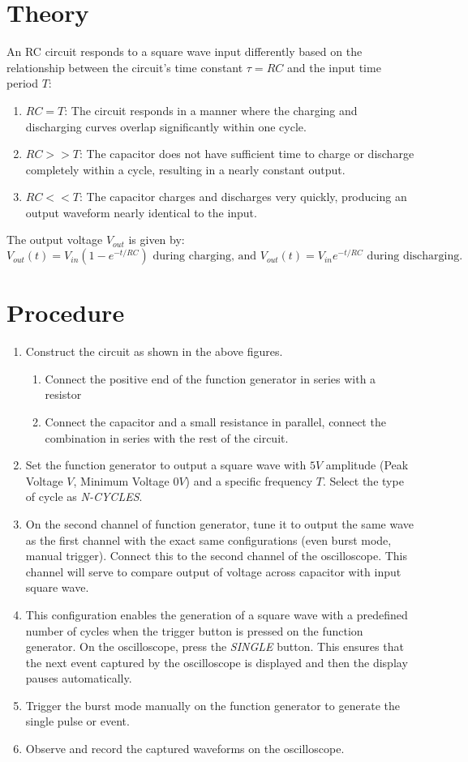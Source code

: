 \documentclass[12pt,a4paper]{article}
\begin{document}
\section*{Theory}
An RC circuit responds to a square wave input differently based on the relationship between the circuit's time constant \(\tau = RC\) and the input time period \(T\):
\begin{enumerate}
    \item \(RC = T\): The circuit responds in a manner where the charging and discharging curves overlap significantly within one cycle.
    \item \(RC >> T\): The capacitor does not have sufficient time to charge or discharge completely within a cycle, resulting in a nearly constant output.
    \item \(RC << T\): The capacitor charges and discharges very quickly, producing an output waveform nearly identical to the input.
\end{enumerate}

The output voltage \(V_{out}\) is given by:
\[ V_{out}(t) = V_{in}(1 - e^{-t/RC}) \text{ during charging, and } V_{out}(t) = V_{in}e^{-t/RC} \text{ during discharging.} \]

\section*{Procedure}
\begin{enumerate}
    \item Construct the circuit as shown in the above figures.
    \begin{enumerate}
        \item Connect the positive end of the function generator in series with a resistor
        \item Connect the capacitor and a small resistance in parallel, connect the combination in series with the rest of the circuit.
    \end{enumerate}
    \item Set the function generator to output a square wave with $5V$ amplitude (Peak Voltage $V$, Minimum Voltage $0V$) and a specific frequency $T$.
    Select the type of cycle as \textit{N-CYCLES}.
    \item On the second channel of function generator, tune it to output the same wave as the first channel with the exact same configurations (even burst mode, manual trigger). Connect this to the second channel of the oscilloscope. This channel will serve to compare output of voltage across capacitor with input square wave.
    \item This configuration enables the generation of a square wave with a predefined number of cycles when the trigger button is pressed on the function generator.
    On the oscilloscope, press the \textit{SINGLE} button. This ensures that the next event captured by the oscilloscope is displayed and then the display pauses automatically.
    \item Trigger the burst mode manually on the function generator to generate the single pulse or event.
    \item Observe and record the captured waveforms on the oscilloscope.
\end{enumerate}
\end{document}
